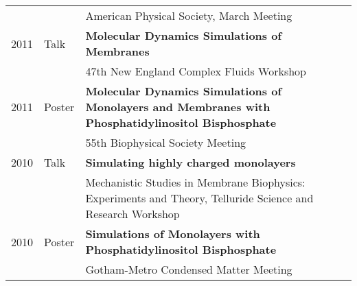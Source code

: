 \documentclass[letterpaper,11pt]{article}
\begin{document}
\begin{tabular}{ll p{14 cm}}
     && American Physical Society, March Meeting\\
2011 & Talk & \textbf{Molecular Dynamics Simulations of Membranes}\\
     && 47th New England Complex Fluids Workshop \\
2011 & Poster & \textbf{Molecular Dynamics Simulations of Monolayers and Membranes with Phosphatidylinositol Bisphosphate} \\
     && 55th Biophysical Society Meeting\\
2010 & Talk & \textbf{Simulating highly charged monolayers}\\
     && Mechanistic Studies in Membrane Biophysics: Experiments and Theory, 
Telluride Science and Research Workshop\\
2010 & Poster & \textbf{Simulations of Monolayers with Phosphatidylinositol Bisphosphate}\\
     && Gotham-Metro Condensed Matter Meeting\\
\end{tabular}
\end{document}
